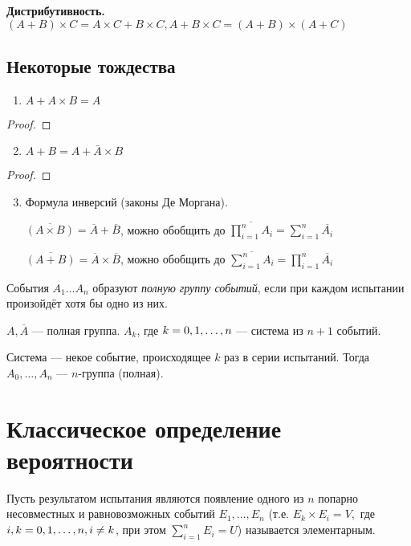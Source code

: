   \textbf{Дистрибутивность.} $(A + B)\times C = A\times C + B\times C,  A + B\times C = (A + B)\times (A + C)$

\subsection{Некоторые тождества}
\begin{enumerate}
  \item $A + A\times B = A$
\end{enumerate}
\begin{proof}
\end{proof}

\begin{enumerate}
  \setcounter{enumi}{1}
\item{$A + B = A + \bar{A}\times B$}
\end{enumerate}
\begin{proof}
\end{proof}

\begin{enumerate}
\setcounter{enumi}{2}
\item Формула инверсий (законы Де Моргана).
\smallskip

  $\overline{(A\times B)} = \overline{A} + \overline{B}$, можно обобщить до $\overline{\prod\limits_{i=1}^n A_i} = \sum\limits_{i=1}^n \overline{A_i} $

  $\overline{(A + B)} = \overline{A}\times \overline{B}$, можно обобщить до $\overline{\sum\limits_{i=1}^n A_i} = \prod\limits_{i=1}^n \overline{A_i} $
\end{enumerate}
 События $A_1 \dots A_n$ образуют \textit{полную группу событий}, если при каждом испытании произойдёт хотя бы одно из них.
\smallskip

\example $A, \overline{A}$ --- полная группа. $A_k$, где $k = 0,1,\dots,n$ --- система из $n + 1$ событий.

Система --- некое событие, происходящее $k$ раз в серии испытаний. Тогда $A_0, \dots, A_n$ --- $n$-группа (полная).

\section{Классическое определение вероятности}
Пусть результатом испытания являются появление одного из $n$ попарно несовместных и равновозможных событий $E_1, \dots, E_n$ (т.е. $E_k\times E_i = V,$ где $i, k = 0,1,\dots,n, i \not= k$, при этом $\sum\limits_{i = 1}^n E_i = U$) называется элементарным.

